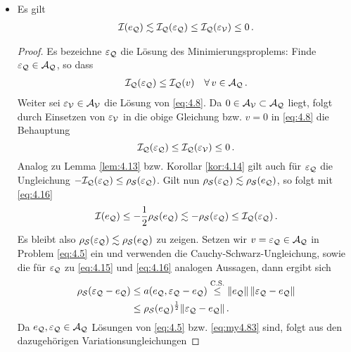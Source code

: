 \begin{itemize}
\item 
\begin{lemma}\label{lem:4.27}
Es gilt
\begin{align}\label{eq:4.82}
	\mathcal I(e_{\mathcal Q}) \lesssim \mathcal I_{\mathcal Q} (\varepsilon_{\mathcal Q}) \le \mathcal I_{\mathcal Q} (\varepsilon_{\mathcal V}) \le 0 \, .
\end{align}
\end{lemma}

\begin{proof}
Es bezeichne $\varepsilon_{\mathcal Q}$ die Lösung des Minimierungsproplems: Finde $\varepsilon_{\mathcal Q}\in \mathcal A_{\mathcal Q}$, so dass
\begin{align}\label{eq:my4.83}
	\mathcal I_{\mathcal Q} (\varepsilon_{\mathcal Q}) \le \mathcal I_{\mathcal Q} (v) \quad \forall \, v \in \mathcal A_{\mathcal Q} \, .
\end{align}
Weiter sei $\varepsilon_{\mathcal V}\in \mathcal A_{\mathcal V}$ die Lösung von \eqref{eq:4.8}. Da $0 \in \mathcal A_{\mathcal V} \subset \mathcal A_{\mathcal Q}$ liegt, folgt durch Einsetzen von $\varepsilon_{\mathcal V}$ in die obige Gleichung bzw. $v = 0$ in \eqref{eq:4.8} die Behauptung
\[
	\mathcal I_{\mathcal Q}(\varepsilon_{\mathcal Q}) \le \mathcal I_{\mathcal Q} (\varepsilon_{\mathcal V}) \le 0 \, .
\]
Analog zu Lemma \ref{lem:4.13} bzw. Korollar \ref{kor:4.14} gilt auch für $\varepsilon_{\mathcal Q}$ die Ungleichung $-\mathcal I_{\mathcal Q} (\varepsilon_{\mathcal Q}) \le \rho_{\mathcal S} (\varepsilon_{\mathcal Q})$. Gilt nun $\rho_{\mathcal S} (\varepsilon_{\mathcal Q}) \lesssim \rho_{\mathcal S}(e_{\mathcal Q})$, so folgt mit \eqref{eq:4.16}
\[
	\mathcal I(e_{\mathcal Q}) \le -\frac 12 \rho_{\mathcal S} (e_{\mathcal Q}) \lesssim -\rho_{\mathcal S} (\varepsilon_{\mathcal Q}) \le \mathcal I_{\mathcal Q}(\varepsilon_{\mathcal Q}) \, .
\]
Es bleibt also $\rho_{\mathcal S} (\varepsilon_{\mathcal Q}) \lesssim \rho_{\mathcal S}(e_{\mathcal Q})$ zu zeigen. Setzen wir $v = \varepsilon_{\mathcal Q}\in \mathcal A_{\mathcal Q}$ in Problem \eqref{eq:4.5} ein und verwenden die Cauchy-Schwarz-Ungleichung, sowie die für $\varepsilon_{\mathcal Q}$ zu \eqref{eq:4.15} und \eqref{eq:4.16} analogen Aussagen, dann ergibt sich
\begin{align}\label{eq:my4.84}
\begin{aligned}
	\rho_{\mathcal S} (\varepsilon_{\mathcal Q}-e_{\mathcal Q}) &\le a(e_{\mathcal Q},\varepsilon_{\mathcal Q}-e_{\mathcal Q}) \stackrel{\scriptsize \text{C.S.}}\le \lVert e_{\mathcal Q}\rVert \, \lVert \varepsilon_{\mathcal Q}-e_{\mathcal Q}\rVert \\
	& \le \rho_{\mathcal S}(e_{\mathcal Q})^{\frac 12} \lVert \varepsilon_{\mathcal Q}-e_{\mathcal Q}\rVert \, .
\end{aligned}
\end{align}
Da $e_{\mathcal Q},\varepsilon_{\mathcal Q}\in \mathcal A_{\mathcal Q}$ Lösungen von \eqref{eq:4.5} bzw. \eqref{eq:my4.83} sind, folgt aus den dazugehörigen Variationsungleichungen

\end{proof}
\end{itemize}
